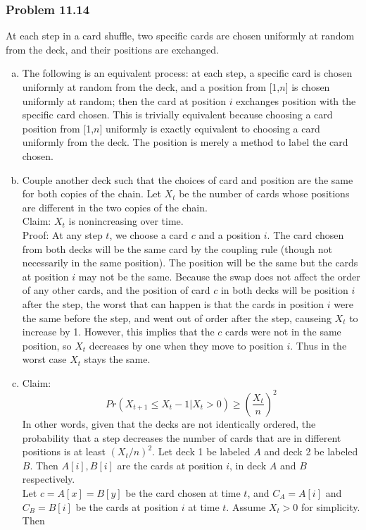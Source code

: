 \documentclass[12pt,letterpaper]{article}
\newenvironment{answer}[1]{
  \subsubsection*{Problem #1}
}{\newpage}
\begin{document}
\begin{answer}{11.14}
At each step in a card shuffle, two specific cards are chosen uniformly at random from the deck, and their positions are exchanged.
\begin{enumerate}[(a)]
	\item The following is an equivalent process: at each step, a specific card is chosen uniformly at random from the deck, and a position from [1,$n$] is chosen uniformly at random; then the card at position $i$ exchanges position with the specific card chosen. This is trivially equivalent because choosing a card position from [1,$n$] uniformly is exactly equivalent to choosing a card uniformly from the deck. The position is merely a method to label the card chosen.

	\item Couple another deck such that the choices of card and position are the same for both copies of the chain. Let $X_t$ be the number of cards whose positions are different in the two copies of the chain. \\
	Claim: $X_t$ is nonincreasing over time. \\
	Proof: At any step $t$, we choose a card $c$ and a position $i$. The card chosen from both decks will be the same card by the coupling rule (though not necessarily in the same position). The position will be the same but the cards at position $i$ may not be the same. Because the swap does not affect the order of any other cards, and the position of card $c$ in both decks will be position $i$ after the step, the worst that can happen is that the cards in position $i$ were the same before the step, and went out of order after the step, causeing $X_t$ to increase by 1. However, this implies that the $c$ cards were not in the same position, so $X_t$ decreases by one when they move to position $i$. Thus in the worst case $X_t$ stays the same.

	\item Claim:
		$$Pr(X_{t+1} \le X_t - 1 | X_t > 0) \ge \left(\frac{X_t}{n}\right)^2$$
	In other words, given that the decks are not identically ordered, the probability that a step decreases the number of cards that are in different positions is at least $(X_t/n)^2$. Let deck 1 be labeled $A$ and deck 2 be labeled $B$. Then $A[i], B[i]$ are the cards at position $i$, in deck $A$ and $B$ respectively. \\


	Let $c = A[x] = B[y]$ be the card chosen at time $t$, and $C_A = A[i]$ and $C_B = B[i]$ be the cards at position $i$ at time $t$. Assume $X_t > 0$ for simplicity. Then


\end{enumerate}
\end{answer}
\end{document}
